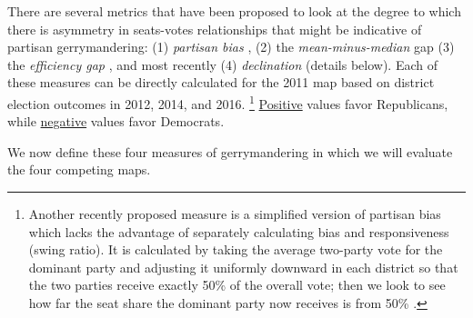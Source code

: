 %
\par
    There are several metrics that have been proposed to look at the degree to which there is asymmetry in seats-votes relationships that might be indicative of partisan gerrymandering: (1) \textit{partisan bias} \citep{Tufte1973}, (2) the \textit{mean-minus-median} gap \citep{Mcdonald_Best_2015_ELJ} (3) the \textit{efficiency gap} \citep{Stephanopoulos2014_UofChicagoLaw}, and most recently (4) \textit{declination} \citep{Warrington2018} (details below). Each of these measures can be directly calculated for the 2011 map based on district election outcomes in 2012, 2014, and 2016.
        \footnote{Another recently proposed measure is a simplified version of partisan bias which lacks the advantage of separately calculating bias and responsiveness (swing ratio). It is calculated by taking the average two-party vote for the dominant party and adjusting it uniformly downward in each district so that the two parties receive exactly 50\% of the overall vote; then we look to see how far the seat share the dominant party now receives is from 50\% \citep{Wang2016_SLR}.}
    \underline{Positive} values favor Republicans, while \underline{negative} values favor Democrats. 
\par
    We now define these four measures of gerrymandering in which we will evaluate the four competing maps.
%
